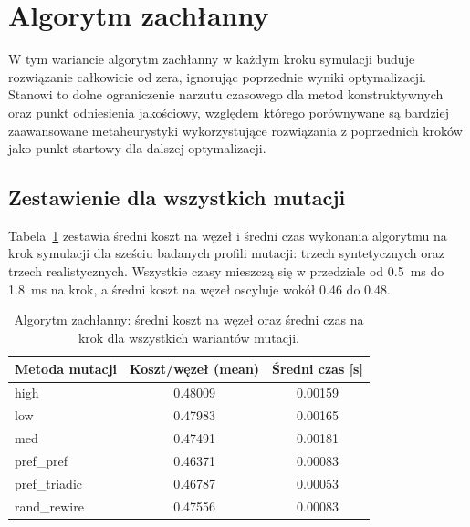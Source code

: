 \section{Algorytm zachłanny}

W tym wariancie algorytm zachłanny w każdym kroku symulacji buduje rozwiązanie całkowicie od zera, ignorując poprzednie wyniki optymalizacji. Stanowi to dolne ograniczenie narzutu czasowego dla metod konstruktywnych oraz punkt odniesienia jakościowy, względem którego porównywane są bardziej zaawansowane metaheurystyki wykorzystujące rozwiązania z poprzednich kroków jako punkt startowy dla dalszej optymalizacji.

\subsection{Zestawienie dla wszystkich mutacji}
Tabela~\ref{tab:greedy-cold-summary} zestawia średni koszt na węzeł i średni czas wykonania algorytmu na krok symulacji dla sześciu badanych profili mutacji: trzech syntetycznych oraz trzech realistycznych. Wszystkie czasy mieszczą się w przedziale od \SI{0.5}{\milli\second} do \SI{1.8}{\milli\second} na krok, a średni koszt na węzeł oscyluje wokół 0.46 do 0.48.

\begin{table}[H]
    \centering
    \caption{Algorytm zachłanny: średni koszt na węzeł oraz średni czas na krok dla wszystkich wariantów mutacji.}
    \label{tab:greedy-cold-summary}
    \begin{tabular}{lcc}
        \toprule
        \textbf{Metoda mutacji} & \textbf{Koszt/węzeł (mean)} & \textbf{Średni czas [s]} \\
        \midrule
        high                    & 0.48009                     & 0.00159                  \\
        low                     & 0.47983                     & 0.00165                  \\
        med                     & 0.47491                     & 0.00181                  \\
        pref\_pref              & 0.46371                     & 0.00083                  \\
        pref\_triadic           & 0.46787                     & 0.00053                  \\
        rand\_rewire            & 0.47556                     & 0.00083                  \\
        \bottomrule
    \end{tabular}
\end{table}

